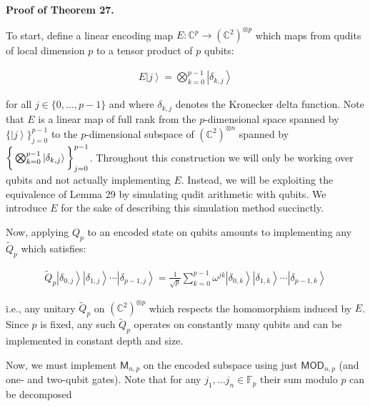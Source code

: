 \par\medskip\noindent\textbf{Proof of Theorem 27.}\par




To start, define a linear encoding map $E\colon\mathbb{C}^{p}\to(\mathbb{C}^{2})^{\otimes p}$ which maps from qudits of local dimension $p$ to a tensor product of $p$ qubits:\par


\[\begin{gathered}
\displaystyle E\left|j\right\rangle=\bigotimes_{k=0}^{p-1}\left|\delta_{k,j}\right\rangle
\end{gathered}\]


for all $j\in\{0,\ldots,p-1\}$ and where $\delta_{k,j}$ denotes the Kronecker delta function. Note that $E$ is a linear map of full rank from the $p$-dimensional space spanned by $\{\left|j\right\rangle\}_{j=0}^{p-1}$ to the $p$-dimensional subspace of $(\mathbb{C}^{2})^{\otimes n}$ spanned by$\bigg{\{}\bigotimes_{k=0}^{p-1}\left|\delta_{k,j}\right\rangle\bigg{\}}_{j=0}^{p-1}$. Throughout this construction we will only be working over qubits and not actually implementing $E$. Instead, we will be exploiting the equivalence of Lemma 29 by simulating qudit arithmetic with qubits. We introduce $E$ for the sake of describing this simulation method succinctly.\par




Now, applying $Q_{p}$ to an encoded state on qubits amounts to implementing any $\tilde{Q}_{p}$ which satisfies:\par


\[\begin{gathered}
\tilde{Q}_{p}\left|\delta_{0,j}\right\rangle\left|\delta_{1,j}\right\rangle\cdots\left|\delta_{p-1,j}\right\rangle=\frac{1}{\sqrt{p}}\sum_{k=0}^{p-1}\omega^{jk}\left|\delta_{0,k}\right\rangle\left|\delta_{1,k}\right\rangle\cdots\left|\delta_{p-1,k}\right\rangle
\end{gathered}\]


i.e., any unitary $\tilde{Q}_{p}$ on $(\mathbb{C}^{2})^{\otimes p}$ which respects the homomorphism induced by $E$. Since $p$ is fixed, any such $\tilde{Q}_{p}$ operates on constantly many qubits and can be implemented in constant depth and size.\par




Now, we must implement $\mathsf{M}_{n,p}$ on the encoded subspace using just $\mathsf{MOD}_{n,p}$ (and one- and two-qubit gates). Note that for any $j_{1},\dots j_{n}\in\mathbb{F}_{p}$ their sum modulo $p$ can be decomposed






